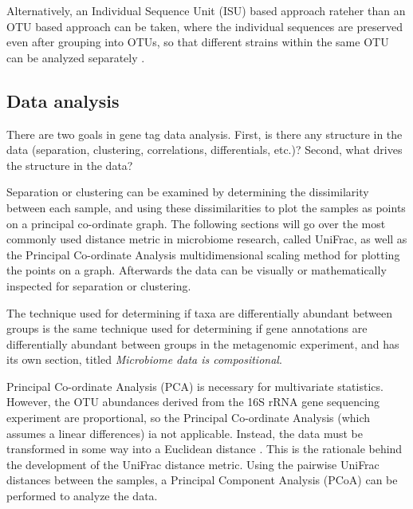 Alternatively, an Individual Sequence Unit (ISU) based approach rateher than an OTU based approach can be taken, where the individual sequences are preserved even after grouping into OTUs, so that different strains within the same OTU can be analyzed separately \cite{callahan2015dada2}.

\FloatBarrier

\subsection{Data analysis}
There are two goals in gene tag data analysis. First, is there any structure in the data (separation, clustering, correlations, differentials, etc.)? Second, what drives the structure in the data?

Separation or clustering can be examined by determining the dissimilarity between each sample, and using these dissimilarities to plot the samples as points on a principal co-ordinate graph. The following sections will go over the most commonly used distance metric in microbiome research, called UniFrac, as well as the Principal Co-ordinate Analysis multidimensional scaling method for plotting the points on a graph. Afterwards the data can be visually or mathematically inspected for separation or clustering.

The technique used for determining if taxa are differentially abundant between groups is the same technique used for determining if gene annotations are differentially abundant between groups in the metagenomic experiment, and has its own section, titled \textit{Microbiome data is compositional}.

Principal Co-ordinate Analysis (PCA) is necessary for multivariate statistics. However, the OTU abundances derived from the 16S rRNA gene sequencing experiment are proportional, so the Principal Co-ordinate Analysis (which assumes a linear differences) ia not applicable. Instead, the data must be transformed in some way into a Euclidean distance \cite{anderson2003canonical}. This is the rationale behind the development of the UniFrac distance metric. Using the pairwise UniFrac distances between the samples, a Principal Component Analysis (PCoA) can be performed to analyze the data.

